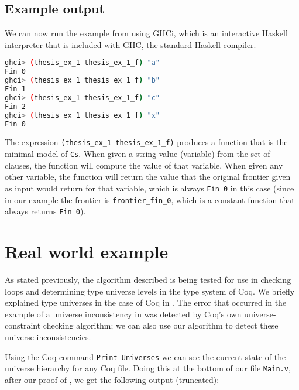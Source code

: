 \subsection{Example output}
\label{sssec:example_output}

We can now run the example from  using GHCi,
which is an interactive Haskell interpreter that is included with GHC, the standard Haskell compiler.

\begin{minipage}{\linewidth}
\begin{lstlisting}[language=bash, label={lst:thm_32_haskell_output}, caption={\lstinline{thm_32} example output}]
ghci> (thesis_ex_1 thesis_ex_1_f) "a"
Fin 0
ghci> (thesis_ex_1 thesis_ex_1_f) "b"
Fin 1
ghci> (thesis_ex_1 thesis_ex_1_f) "c"
Fin 2
ghci> (thesis_ex_1 thesis_ex_1_f) "x"
Fin 0
\end{lstlisting}
\end{minipage}

The expression \lstinline[language=Haskell]{(thesis_ex_1 thesis_ex_1_f)} produces a function that is the minimal model of \lstinline{Cs}.
When given a string value (variable) from the set of clauses, the function will compute the value of that variable.
When given any other variable, the function will return the value that the original frontier given as input
would return for that variable, which is always \lstinline{Fin 0} in this case
(since in our example the frontier is \lstinline{frontier_fin_0},
which is a constant function that always returns \lstinline{Fin 0}).

\section{Real world example}
\label{sec:real_world_example}

As stated previously, the algorithm described  is being
tested for use in checking loops and determining type universe levels in the
type system of Coq.
We briefly explained type universes in the case of Coq in .
The error that occurred in the example of a universe inconsistency in 
was detected by Coq's own universe-constraint checking algorithm;
we can also use our algorithm to detect these universe inconsistencies.

Using the Coq command \lstinline{Print Universes} we can see the current state of the universe hierarchy for any Coq file.
Doing this at the bottom of our file \lstinline{Main.v}, after our proof of ,
we get the following output (truncated):

